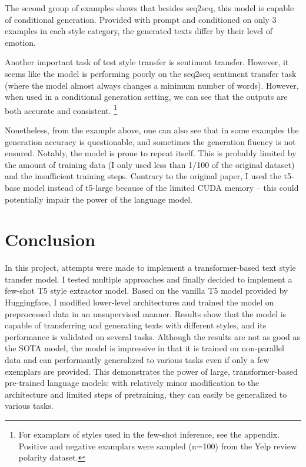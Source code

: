 \documentclass[a4paper]{article}
\begin{document}
The second group of examples shows that besides seq2seq, this model is capable of conditional generation. Provided with prompt and conditioned on only 3 examples in each style category, the generated texts differ by their level of emotion.

Another important task of test style transfer is sentiment transfer. However, it seems like the model is performing poorly on the seq2seq sentiment transfer task (where the model almost always changes a minimum number of words). However, when used in a conditional generation setting, we can see that the outputs are both accurate and consistent. \footnote{For examplars of styles used in the few-shot inference, see the appendix. Positive and negative examplars were sampled (n=100) from the Yelp review polarity dataset.}

Nonetheless, from the example above, one can also see that in some examples the generation accuracy is questionable, and sometimes the generation fluency is not ensured. Notably, the model is prone to repeat itself. This is probably limited by the amount of training data (I only used less than 1/100 of the original dataset) and the insufficient training steps. Contrary to the original paper, I used the t5-base model instead of t5-large because of the limited CUDA memory -- this could potentially impair the power of the language model.

\section{Conclusion}

In this project, attempts were made to implement a transformer-based text style transfer model. I tested multiple approaches and finally decided to implement a few-shot T5 style extractor model. Based on the vanilla T5 model provided by Huggingface, I modified lower-level architectures and trained the model on preprocessed data in an unsupervised manner. Results show that the model is capable of transferring and generating texts with different styles, and its performance is validated on several tasks. Although the results are not as good as the SOTA model, the model is impressive in that it is trained on non-parallel data and can performantly generalized to various tasks even if only a few exemplars are provided. This demonstrates the power of large, transformer-based pre-trained language models: with relatively minor modification to the architecture and limited steps of pretraining, they can easily be generalized to various tasks.
\end{document}
